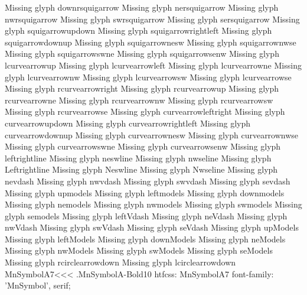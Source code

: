 Missing glyph	downrsquigarrow
Missing glyph	nersquigarrow
Missing glyph	nwrsquigarrow
Missing glyph	swrsquigarrow
Missing glyph	sersquigarrow
Missing glyph	squigarrowupdown
Missing glyph	squigarrowrightleft
Missing glyph	squigarrowdownup
Missing glyph	squigarrownesw
Missing glyph	squigarrownwse
Missing glyph	squigarrowswne
Missing glyph	squigarrowsenw
Missing glyph	lcurvearrowup
Missing glyph	lcurvearrowleft
Missing glyph	lcurvearrowne
Missing glyph	lcurvearrownw
Missing glyph	lcurvearrowsw
Missing glyph	lcurvearrowse
Missing glyph	rcurvearrowright
Missing glyph	rcurvearrowup
Missing glyph	rcurvearrowne
Missing glyph	rcurvearrownw
Missing glyph	rcurvearrowsw
Missing glyph	rcurvearrowse
Missing glyph	curvearrowleftright
Missing glyph	curvearrowupdown
Missing glyph	curvearrowrightleft
Missing glyph	curvearrowdownup
Missing glyph	curvearrownesw
Missing glyph	curvearrownwse
Missing glyph	curvearrowswne
Missing glyph	curvearrowsenw
Missing glyph	leftrightline
Missing glyph	neswline
Missing glyph	nwseline
Missing glyph	Leftrightline
Missing glyph	Neswline
Missing glyph	Nwseline
Missing glyph	nevdash
Missing glyph	nwvdash
Missing glyph	swvdash
Missing glyph	sevdash
Missing glyph	upmodels
Missing glyph	leftmodels
Missing glyph	downmodels
Missing glyph	nemodels
Missing glyph	nwmodels
Missing glyph	swmodels
Missing glyph	semodels
Missing glyph	leftVdash
Missing glyph	neVdash
Missing glyph	nwVdash
Missing glyph	swVdash
Missing glyph	seVdash
Missing glyph	upModels
Missing glyph	leftModels
Missing glyph	downModels
Missing glyph	neModels
Missing glyph	nwModels
Missing glyph	swModels
Missing glyph	seModels
Missing glyph	rcirclearrowdown
Missing glyph	lcirclearrowdown
\<MnSymbolA7\><<<
.MnSymbolA-Bold10
htfcss:  MnSymbolA7  font-family: 'MnSymbol', serif;

